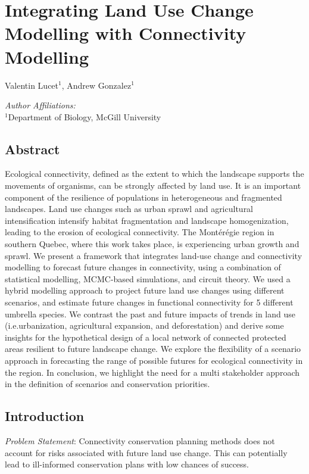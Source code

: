 \chapter{Integrating Land Use Change Modelling with Connectivity Modelling}
\begin{center}
{Valentin Lucet$^{1}$, Andrew Gonzalez$^{1}$}\\
\end{center}
\textit{Author Affiliations:}\\
\normalsize{$^{1}$Department of Biology, McGill University}\\
\section{Abstract}

Ecological connectivity, defined as the extent to which the landscape supports the movements of organisms, can be strongly affected by land use. It is an important component of the resilience of populations in heterogeneous and fragmented landscapes. Land use changes such as urban sprawl and agricultural intensification intensify habitat fragmentation and landscape homogenization, leading to the erosion of ecological connectivity. The Montérégie region in southern Quebec, where this work takes place, is experiencing urban growth and sprawl. We present a framework that integrates land-use change and connectivity modelling to forecast future changes in connectivity, using a combination of statistical modelling, MCMC-based simulations, and circuit theory. We used a hybrid modelling approach to project future land use changes using different scenarios, and estimate future changes in functional connectivity for 5 different umbrella species. We contrast the past and future impacts of trends in land use (i.e.urbanization, agricultural expansion, and deforestation) and derive some insights for the hypothetical design of a local network of connected protected areas resilient to future landscape change. We explore the flexibility of a scenario approach in forecasting the range of possible futures for ecological connectivity in the region. In conclusion, we highlight the need for a multi stakeholder approach in the definition of scenarios and conservation priorities.\\

\section{Introduction}
\textit{Problem Statement}: Connectivity conservation planning methods does not account for risks associated with future land use change. This can potentially lead to ill-informed conservation plans with low chances of success.

